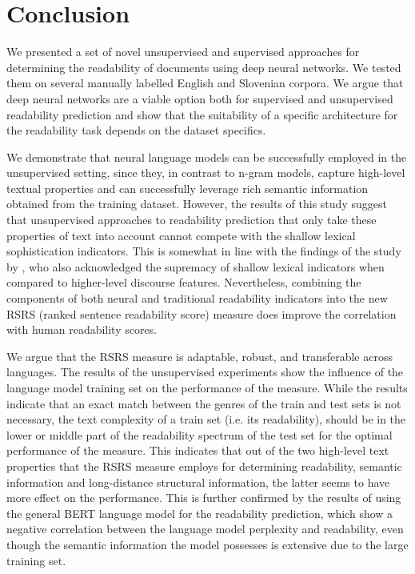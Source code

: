 \documentclass{clv3}
\begin{document}
\section{Conclusion}
\label{sec:conclusion}
We presented a set of novel unsupervised and supervised approaches for determining the readability of documents using deep neural networks. We tested them on several manually labelled English and Slovenian corpora. We argue that deep neural networks are a viable option both for supervised and unsupervised readability prediction and show that the suitability of a specific architecture for the readability task depends on the dataset specifics. 

We demonstrate that neural language models can be successfully employed in the unsupervised setting, since they, in contrast to n-gram models,  capture high-level textual properties and can successfully leverage rich semantic information obtained from the training dataset. However, the results of this study suggest that unsupervised approaches to readability prediction that only take these properties of text into account cannot compete with the shallow lexical sophistication indicators. This is somewhat in line with the findings of the study by \citet{todirascu-etal-2016-cohesive}, who also acknowledged the supremacy of shallow lexical indicators when compared to higher-level discourse features. Nevertheless, combining the components of both neural and traditional readability indicators into the new RSRS (ranked sentence readability score) measure does improve the correlation with human readability scores. 

We argue that the RSRS measure is adaptable, robust, and transferable across languages. The results of the unsupervised experiments show the influence of the language model training set on the performance of the measure. While the results indicate that an exact match between the genres of the train and test sets is not necessary, the text complexity of a train set (i.e. its readability), should be in the lower or middle part of the readability spectrum of the test set for the optimal performance of the measure. This indicates that out of the two high-level text properties that the RSRS measure employs for determining readability, semantic information and long-distance structural information, the latter seems to have more effect on the performance. This is further confirmed by the results of using the general BERT language model for the readability prediction, which show a negative correlation between the language model perplexity and readability, even though the semantic information the model possesses is extensive due to the large training set. 
\end{document}
